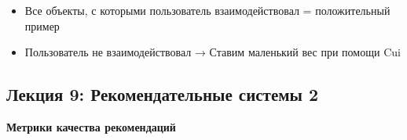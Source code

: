 \documentclass[a4paper, 12pt]{article}
\begin{document}
\begin{itemize}
\begin{itemize}
\begin{itemize}
\begin{itemize}
      \item
        
        Все объекты, с которыми пользователь взаимодействовал =
        положительный пример
        
      \item
        
        Пользователь не взаимодействовал → Ставим маленький вес при
        помощи Cui
        
      \end{itemize}
    \end{itemize}
  \end{itemize}
\end{itemize}

\subsection{\texorpdfstring{\textbf{Лекция 9: Рекомендательные системы
2}}{Лекция 9: Рекомендательные системы 2}}\label{ux43bux435ux43aux446ux438ux44f-9-ux440ux435ux43aux43eux43cux435ux43dux434ux430ux442ux435ux43bux44cux43dux44bux435-ux441ux438ux441ux442ux435ux43cux44b-2}

\textbf{Метрики качества рекомендаций}
\end{document}
